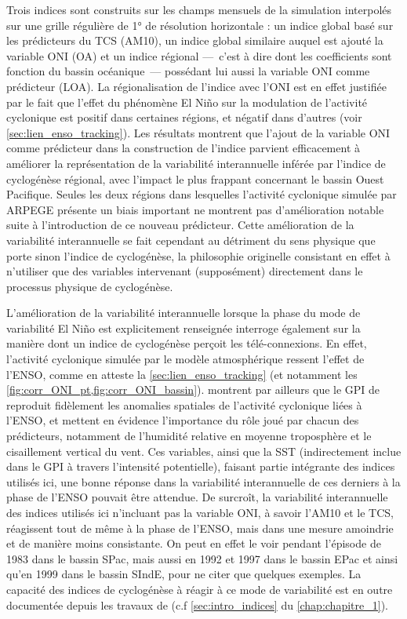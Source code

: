 \documentclass[../main.tex]{subfiles}
\begin{document}
Trois indices sont construits sur les champs mensuels de la simulation interpolés sur une grille régulière de \ang{1} de résolution horizontale : un indice
global basé sur les prédicteurs du TCS (AM10), un indice global similaire auquel est ajouté la variable ONI (OA) et un indice régional ---~c'est à dire dont les
coefficients sont fonction du bassin océanique~--- possédant lui aussi la variable ONI comme prédicteur (LOA). La régionalisation de l'indice avec l'ONI est en
effet justifiée par le fait que l'effet du phénomène El Niño sur la modulation de l'activité cyclonique est positif dans certaines régions, et négatif dans
d'autres (voir \cref{sec:lien_enso_tracking}). Les résultats montrent que l'ajout de la variable ONI comme prédicteur dans la construction de l'indice parvient
efficacement à améliorer la représentation de la variabilité interannuelle inférée par l'indice de cyclogénèse régional, avec l'impact le plus frappant
concernant le bassin Ouest Pacifique. Seules les deux régions dans lesquelles l'activité cyclonique simulée par ARPEGE présente un biais important ne montrent
pas d'amélioration notable suite à l'introduction de ce nouveau prédicteur. Cette amélioration de la variabilité interannuelle se fait cependant au détriment du
sens physique que porte sinon l'indice de cyclogénèse, la philosophie originelle consistant en effet à n'utiliser que des variables intervenant (supposément)
directement dans le processus physique de cyclogénèse.

L'amélioration de la variabilité interannuelle lorsque la phase du mode de variabilité El Niño est explicitement renseignée interroge également sur la manière
dont un indice de cyclogénèse perçoit les télé-connexions. En effet, l'activité cyclonique simulée par le modèle atmosphérique ressent l'effet de l'ENSO, comme
en atteste la \cref{sec:lien_enso_tracking} (et notamment les \cref{fig:corr_ONI_pt,fig:corr_ONI_bassin}). \textcite{camargo_use_2007} montrent par ailleurs que
le GPI de \textcite{emanuel_tropical_2004} reproduit fidèlement les anomalies spatiales de l'activité cyclonique liées à l'ENSO, et mettent en évidence
l'importance du rôle joué par chacun des prédicteurs, notamment de l'humidité relative en moyenne troposphère et le cisaillement vertical du vent. Ces
variables, ainsi que la SST (indirectement inclue dans le GPI à travers l'intensité potentielle), faisant partie intégrante des indices utilisés ici, 
une bonne réponse dans la variabilité interannuelle de ces
derniers à la phase de l'ENSO pouvait être attendue. De surcroît, la variabilité interannuelle des indices utilisés ici n'incluant pas la variable ONI, à savoir
l'AM10 et le TCS, réagissent tout de même à la phase de l'ENSO, mais dans une mesure amoindrie et de manière moins consistante. On peut en effet le voir pendant
l'épisode de 1983 dans le bassin SPac, mais aussi en 1992 et 1997 dans le bassin EPac et ainsi qu'en 1999 dans le bassin SIndE, pour ne citer que quelques
exemples. La capacité des indices de cyclogénèse à réagir à ce mode de variabilité est en outre documentée depuis les travaux de
\textcite{watterson_seasonal_1995} (c.f \cref{sec:intro_indices} du \cref{chap:chapitre_1}).
\end{document}
